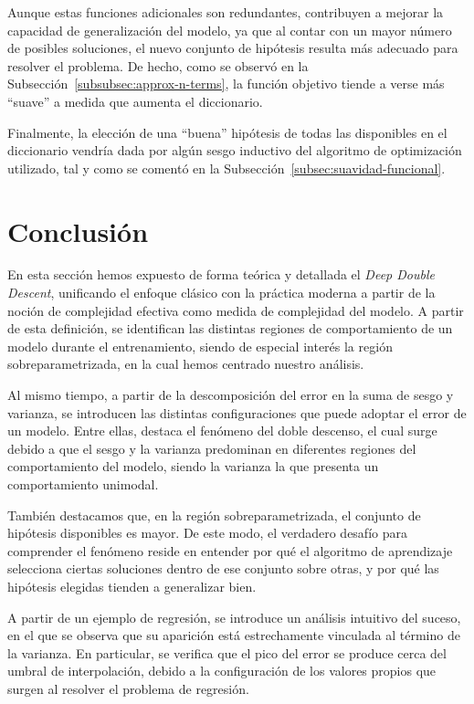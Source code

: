 Aunque estas funciones adicionales son redundantes, contribuyen a mejorar la capacidad de generalización del modelo, ya que al contar con un mayor número de posibles soluciones, el nuevo conjunto de hipótesis resulta más adecuado para resolver el problema. De hecho, como se observó en la Subsección~\ref{subsubsec:approx-n-terms}, la función objetivo tiende a verse más “suave” a medida que aumenta el diccionario.\newline

Finalmente, la elección de una ``buena'' hipótesis de todas las disponibles en el diccionario vendría dada por algún sesgo inductivo del algoritmo de optimización utilizado, tal y como se comentó en la Subsección~\ref{subsec:suavidad-funcional}.

\section{Conclusión}\label{sec:conclusion-matematica}

En esta sección hemos expuesto de forma teórica y detallada el \textit{Deep Double Descent}, unificando el enfoque clásico con la práctica moderna a partir de la noción de complejidad efectiva como medida de complejidad del modelo. A partir de esta definición, se identifican las distintas regiones de comportamiento de un modelo durante el entrenamiento, siendo de especial interés la región sobreparametrizada, en la cual hemos centrado nuestro análisis.\newline

Al mismo tiempo, a partir de la descomposición del error en la suma de sesgo y varianza, se introducen las distintas configuraciones que puede adoptar el error de un modelo. Entre ellas, destaca el fenómeno del doble descenso, el cual surge debido a que el sesgo y la varianza predominan en diferentes regiones del comportamiento del modelo, siendo la varianza la que presenta un comportamiento unimodal.\newline

También destacamos que, en la región sobreparametrizada, el conjunto de hipótesis disponibles es mayor. De este modo, el verdadero desafío para comprender el fenómeno reside en entender por qué el algoritmo de aprendizaje selecciona ciertas soluciones dentro de ese conjunto sobre otras, y por qué las hipótesis elegidas tienden a generalizar bien.\newline

A partir de un ejemplo de regresión, se introduce un análisis intuitivo del suceso, en el que se observa que su aparición está estrechamente vinculada al término de la varianza. En particular, se verifica que el pico del error se produce cerca del umbral de interpolación, debido a la configuración de los valores propios que surgen al resolver el problema de regresión.\newline


